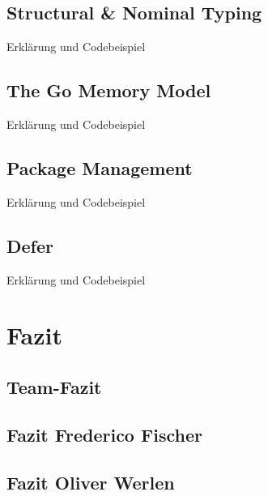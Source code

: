 \documentclass[12pt,titlepage]{article}
\begin{document}
\subsection{Structural \& Nominal Typing}
Erklärung und Codebeispiel


\subsection{The Go Memory Model}
Erklärung und Codebeispiel


\subsection{Package Management}
Erklärung und Codebeispiel


\subsection{Defer}
Erklärung und Codebeispiel

\section{Fazit}
\subsection{Team-Fazit}

\subsection{Fazit Frederico Fischer}

\subsection{Fazit Oliver Werlen}

    
\end{document}
